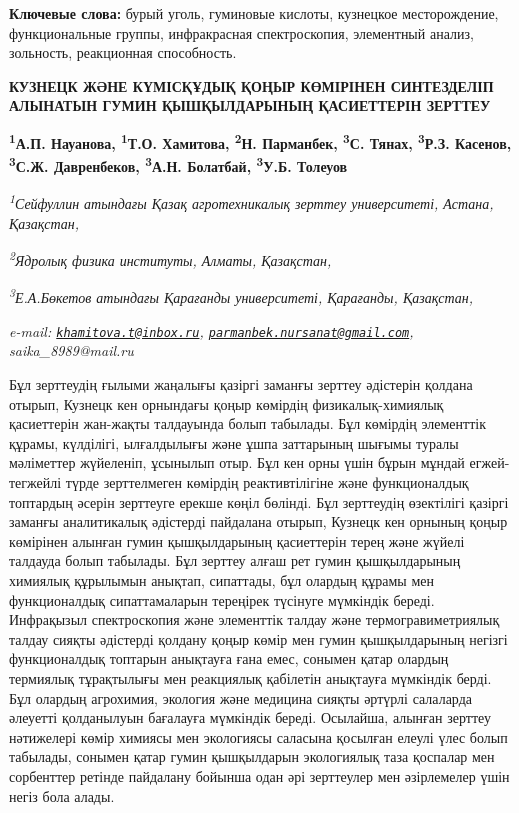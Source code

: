 {\bfseries Ключевые слова:} бурый уголь, гуминовые кислоты, кузнецкое
месторождение, функциональные группы, инфракрасная спектроскопия,
элементный анализ, зольность, реакционная способность.

\begin{articleheader}
{\bfseries КУЗНЕЦК ЖӘНЕ КҮМІСҚҰДЫҚ ҚОҢЫР КӨМІРІНЕН СИНТЕЗДЕЛІП АЛЫНАТЫН ГУМИН ҚЫШҚЫЛДАРЫНЫҢ ҚАСИЕТТЕРІН ЗЕРТТЕУ}

{\bfseries
\textsuperscript{1}А.П. Науанова,
\textsuperscript{1}Т.О. Хамитова\textsuperscript{\envelope },
\textsuperscript{2}Н. Парманбек\textsuperscript{\envelope },
\textsuperscript{3}С. Тянах\textsuperscript{\envelope },
\textsuperscript{3}Р.З. Касенов,
\textsuperscript{3}С.Ж. Давренбеков,
\textsuperscript{3}А.Н. Болатбай,
\textsuperscript{3}У.Б. Толеуов}
\end{articleheader}

\begin{affiliation}
\emph{\textsuperscript{1}Сейфуллин атындағы Қазақ агротехникалық зерттеу университеті, Астана, Қазақстан,}

\emph{\textsuperscript{2}Ядролық физика институты, Алматы, Қазақстан,}

\emph{\textsuperscript{3}Е.А.Бөкетов атындағы Қарағанды университеті, Қарағанды, Қазақстан,}

\emph{e-mail: \href{mailto:khamitova.t@inbox.ru}{\nolinkurl{khamitova.t@inbox.ru}}, \href{mailto:parmanbek.nursanat@gmail.com}{\nolinkurl{parmanbek.nursanat@gmail.com}}, saika\_8989@mail.ru}
\end{affiliation}

Бұл зерттеудің ғылыми жаңалығы қазіргі заманғы зерттеу әдістерін қолдана
отырып, Кузнецк кен орнындағы қоңыр көмірдің физикалық-химиялық
қасиеттерін жан-жақты талдауында болып табылады. Бұл көмірдің элементтік
құрамы, күлділігі, ылғалдылығы және ұшпа заттарының шығымы туралы
мәліметтер жүйеленіп, ұсынылып отыр. Бұл кен орны үшін бұрын мұндай
егжей-тегжейлі түрде зерттелмеген көмірдің реактивтілігіне және
функционалдық топтардың әсерін зерттеуге ерекше көңіл бөлінді. Бұл
зерттеудің өзектілігі қазіргі заманғы аналитикалық әдістерді пайдалана
отырып, Кузнецк кен орнының қоңыр көмірінен алынған гумин қышқылдарының
қасиеттерін терең және жүйелі талдауда болып табылады. Бұл зерттеу алғаш
рет гумин қышқылдарының химиялық құрылымын анықтап, сипаттады, бұл
олардың құрамы мен функционалдық сипаттамаларын тереңірек түсінуге
мүмкіндік береді. Инфрақызыл спектроскопия және элементтік талдау және
термогравиметриялық талдау сияқты әдістерді қолдану қоңыр көмір мен
гумин қышқылдарының негізгі функционалдық топтарын анықтауға ғана емес,
сонымен қатар олардың термиялық тұрақтылығы мен реакциялық қабілетін
анықтауға мүмкіндік берді. Бұл олардың агрохимия, экология және медицина
сияқты әртүрлі салаларда әлеуетті қолданылуын бағалауға мүмкіндік
береді. Осылайша, алынған зерттеу нәтижелері көмір химиясы мен
экологиясы саласына қосылған елеулі үлес болып табылады, сонымен қатар
гумин қышқылдарын экологиялық таза қоспалар мен сорбенттер ретінде
пайдалану бойынша одан әрі зерттеулер мен әзірлемелер үшін негіз бола
алады.

